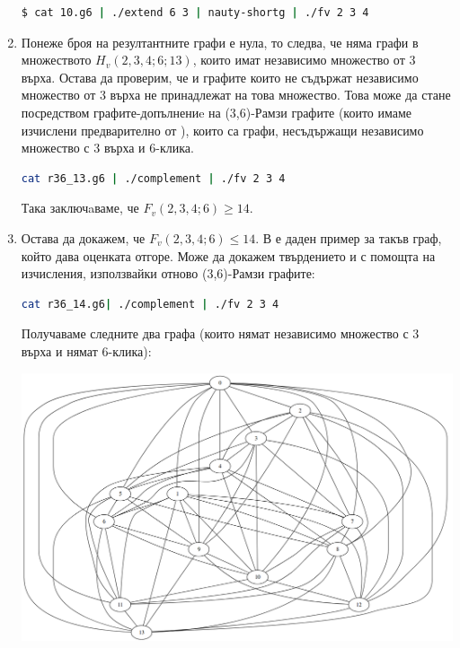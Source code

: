 \documentclass[letterpaper,12pt]{article}
\theoremstyle{definition}
\begin{document}
\begin{enumerate}[Стъпка 1:]
\begin{lstlisting}[language=bash]
$ cat 10.g6 | ./extend 6 3 | nauty-shortg | ./fv 2 3 4
\end{lstlisting}

\item Понеже броя на резултантните графи е нула, то следва, че няма графи в множеството $H_v(2, 3, 4; 6; 13)$, които имат независимо множество от 3 върха. Остава да проверим, че и графите които не съдържат независимо множество от 3 върха не принадлежат на това множество. Това може да стане посредством графите-допълнениe на (3,6)-Рамзи графите (които имаме изчислени предварително от \cite{mckay}), които са графи, несъдържащи независимо множество с 3 върха и 6-клика.

\begin{lstlisting}[language=bash]
cat r36_13.g6 | ./complement | ./fv 2 3 4
\end{lstlisting}

Така заключaваме, че  $F_v(2,3,4;6)\geq14$.

\item Остава да докажем, че $F_v(2,3,4;6)\leq14$. В \cite{nenovnedialkov} е даден пример за такъв граф, който дава оценката отгоре. Може да докажем твърдението и с помощта на изчисления, използвайки отново (3,6)-Рамзи графите:

\begin{lstlisting}[language=bash]
cat r36_14.g6| ./complement | ./fv 2 3 4
\end{lstlisting}

Получаваме следните два графа (които нямат независимо множество с 3 върха и нямат 6-клика):

\includegraphics[scale=0.25]{first14vertex.png}


\end{enumerate}
\end{document}
